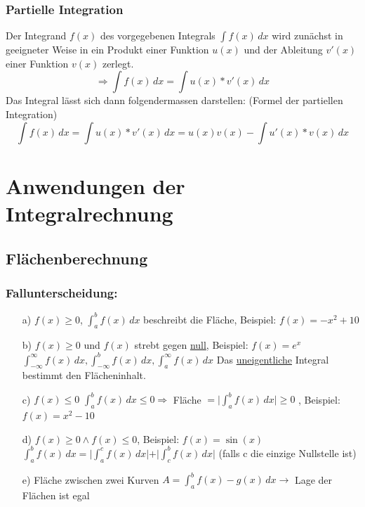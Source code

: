 \documentclass[11pt]{amsart}
\theoremstyle{remark}
\begin{document}
\subsubsection{Partielle Integration}
Der Integrand $f(x)$ des vorgegebenen Integrals $\int f(x)\,dx$ wird zun\"achst in geeigneter Weise in ein Produkt einer Funktion $u(x)$ und der Ableitung $v'(x)$ einer Funktion $v(x)$ zerlegt.
\begin{equation*}
	\Rightarrow \int f(x)\,dx = \int u(x)*v'(x)\,dx
\end{equation*}
Das Integral l\"asst sich dann folgendermassen darstellen: (Formel der partiellen Integration)
\begin{equation*}
	\int f(x)\,dx = \int u(x)*v'(x)\,dx = u(x)v(x) - \int u'(x)*v(x)\,dx
\end{equation*}

\section{Anwendungen der Integralrechnung}
\subsection{Fl\"achenberechnung}
\subsubsection*{Fallunterscheidung:}
\begin{itemize}
	\item[a)] $f(x)\geq 0$, $\int_a^b f(x)\,dx$ beschreibt die Fl\"ache, Beispiel: $f(x)=-x^2+10$
	\item[b)] $f(x)\geq 0$ und $f(x)$ strebt gegen \underline{null}, Beispiel: $f(x)=e^x$\newline 
		$\int_{-\infty}^\infty f(x)\,dx , \int_{-\infty}^b f(x)\,dx , \int_{a}^\infty f(x)\,dx $	\newline
		Das \underline{uneigentliche} Integral bestimmt den Fl\"acheninhalt.
	\item[c)] $f(x) \leq 0$ $ \int_a^b f(x) \,dx \leq 0 \Rightarrow$ Fl\"ache $= \vert \int_a^b f(x) \,dx \vert 			\geq 0$ , Beispiel: $f(x)=x^2-10$
	\item[d)] $f(x) \geq 0 \land f(x) \leq 0$, Beispiel: $f(x)=\sin(x)$\newline
		$\int_a^b f(x) \,dx = \vert\int_a^c f(x) \,dx \vert + \vert \int_c^b f(x) \,dx \vert$ (falls c die einzige Nullstelle ist)
	\item[e)] Fl\"ache zwischen zwei Kurven\newline
		$A = \int_a^b f(x)-g(x)\,dx \rightarrow$ Lage der Fl\"achen ist egal
\end{itemize}
\end{document}
